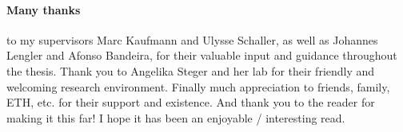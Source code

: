 \paragraph{Many thanks} to my supervisors Marc Kaufmann and Ulysse Schaller, as well as Johannes Lengler and Afonso Bandeira, for their valuable input and guidance throughout the thesis. Thank you to Angelika Steger and her lab for their friendly and welcoming research environment. Finally much appreciation to friends, family, ETH, etc. for their support and existence. And thank you to the reader for making it this far! I hope it has been an enjoyable / interesting read.









